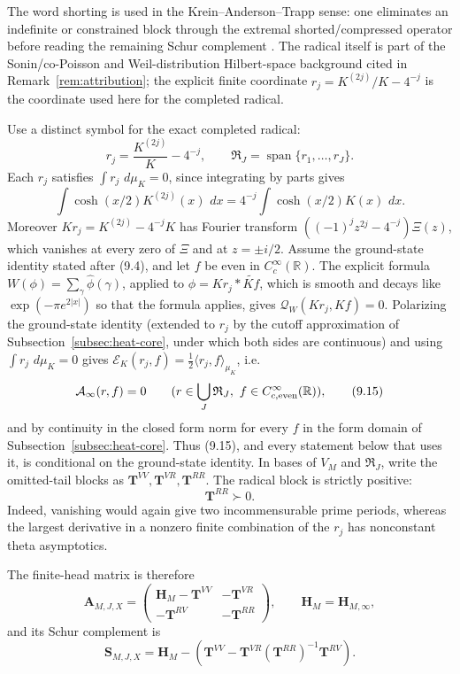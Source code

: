 \documentclass[11pt]{amsart}
\theoremstyle{definition}
\theoremstyle{remark}
\newcommand{\dd}{\,d}
\newcommand{\QW}{\mathcal Q_W}
\newcommand{\XiR}{\Xi}
\begin{document}
The word shorting is used in the Krein--Anderson--Trapp sense:
one eliminates an indefinite or constrained block through the extremal
shorted/compressed operator before reading the remaining Schur complement
\cite{Krein1947,Anderson1971,AndersonTrapp1975}.  The radical itself is
part of the Sonin/co-Poisson and Weil-distribution Hilbert-space
background cited in Remark~\ref{rem:attribution}; the explicit finite coordinate
\(r_j=K^{(2j)}/K-4^{-j}\) is the coordinate used here for the completed
radical.

Use a distinct symbol for the exact completed radical:
\[
 r_j=\frac{K^{(2j)}}K-4^{-j},
\qquad
 \mathfrak R_J=\operatorname{span}\{r_1,\dots,r_J\}.
\tag{9.14}
\]
Each \(r_j\) satisfies \(\int r_j\,\dd\mu_K=0\), since integrating by parts gives
\[
 \int\cosh(x/2)K^{(2j)}(x)\,\dd x=4^{-j}\int\cosh(x/2)K(x)\,\dd x .
\]
Moreover \(Kr_j=K^{(2j)}-4^{-j}K\) has Fourier transform
\(((-1)^jz^{2j}-4^{-j})\XiR(z)\), which vanishes at every zero of
\(\XiR\) and at \(z=\pm i/2\).  Assume the ground-state identity stated
after (9.4), and let \(f\) be even in \(C_c^\infty(\mathbb R)\).  The
explicit formula \(W(\phi)=\sum_\gamma\widehat\phi(\gamma)\), applied to
\(\phi=Kr_j*\widetilde{Kf}\), which is smooth and decays like
\(\exp(-\pi e^{2|x|})\) so that the formula applies, gives
\(\QW(Kr_j,Kf)=0\).  Polarizing the ground-state identity (extended to
\(r_j\) by the cutoff approximation of Subsection~\ref{subsec:heat-core},
under which both sides are continuous) and using \(\int r_j\,\dd\mu_K=0\)
gives \(\mathscr E_K(r_j,f)=\frac12\langle r_j,f\rangle_{\mu_K}\), i.e.
\[
 \mathcal A_\infty(r,f)=0
 \qquad(r\in\bigcup_J\mathfrak R_J,\ f\in C_{c,\rm even}^\infty(\mathbb R)),
\tag{9.15}
\]
and by continuity in the closed form norm for every \(f\) in the form
domain of Subsection~\ref{subsec:heat-core}.  Thus (9.15), and every
statement below that uses it, is conditional on the ground-state identity.
In bases of \(V_M\) and \(\mathfrak R_J\), write the omitted-tail blocks
as \(\mathbf T^{VV},\mathbf T^{VR},\mathbf T^{RR}\).  The radical block is
strictly positive:
\[
 \mathbf T^{RR}\succ0.
\tag{9.16}
\]
Indeed, vanishing would again give two incommensurable prime periods,
whereas the largest derivative in a nonzero finite combination of the
\(r_j\) has nonconstant theta asymptotics.

The finite-head matrix is therefore
\[
 \mathbf A_{M,J,X}=
 \begin{pmatrix}
  \mathbf H_M-\mathbf T^{VV}&-\mathbf T^{VR}\\
  -\mathbf T^{RV}&-\mathbf T^{RR}
 \end{pmatrix},
\qquad \mathbf H_M=\mathbf H_{M,\infty},
\tag{9.17}
\]
and its Schur complement is
\[
 \mathbf S_{M,J,X}
 =\mathbf H_M-
 \left(
 \mathbf T^{VV}
 -\mathbf T^{VR}(\mathbf T^{RR})^{-1}\mathbf T^{RV}
 \right).
\tag{9.18}
\]
\end{document}
